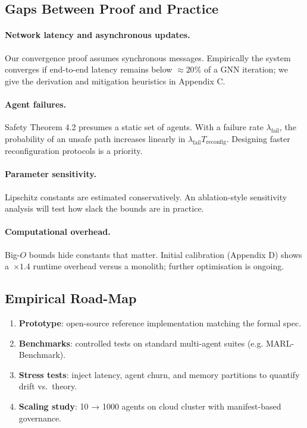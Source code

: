 \documentclass{article}
\begin{document}
\subsection{Gaps Between Proof and Practice}

\paragraph{Network latency and asynchronous updates.}
Our convergence proof assumes synchronous messages. Empirically the system converges if end-to-end latency remains below $\approx\!20\%$ of a GNN iteration; we give the derivation and mitigation heuristics in Appendix C.

\paragraph{Agent failures.}
Safety Theorem 4.2 presumes a static set of agents. With a failure rate $\lambda_{\text{fail}}$, the probability of an unsafe path increases linearly in $\lambda_{\text{fail}}T_{\text{reconfig}}$. Designing faster reconfiguration protocols is a priority.

\paragraph{Parameter sensitivity.}
Lipschitz constants are estimated conservatively. An ablation-style sensitivity analysis will test how slack the bounds are in practice.

\paragraph{Computational overhead.}
Big-$O$ bounds hide constants that matter. Initial calibration (Appendix D) shows a~$\times1.4$ runtime overhead versus a monolith; further optimisation is ongoing.

\subsection{Empirical Road-Map}
\begin{enumerate}[leftmargin=*,label=\arabic*.]
\item \textbf{Prototype}: open-source reference implementation matching the formal spec.  
\item \textbf{Benchmarks}: controlled tests on standard multi-agent suites (e.g. MARL-Benchmark).  
\item \textbf{Stress tests}: inject latency, agent churn, and memory partitions to quantify drift vs.\ theory.  
\item \textbf{Scaling study}: 10 → 1000 agents on cloud cluster with manifest-based governance.  
\end{enumerate}
\end{document}
